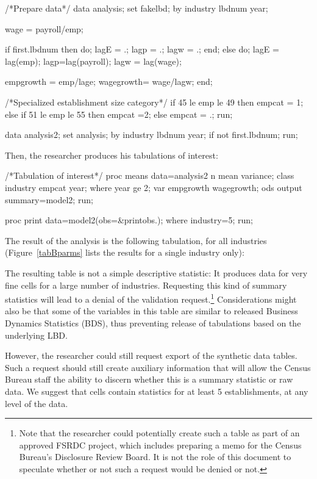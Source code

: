 \documentclass{article}
\begin{document}
\begin{Datastep}
/*Prepare data*/
data analysis;
set fakelbd;
by industry lbdnum year;

wage = payroll/emp;

if first.lbdnum then do;
 lagE = .;         lagp = .;         lagw = .;         
 end;
else                 do; 
 lagE = lag(emp);
 lagp=lag(payroll); 
 lagw = lag(wage); 

 empgrowth = emp/lage;
 wagegrowth= wage/lagw;
end;

/*Specialized establishment size category*/
if 45 le emp le 49 then empcat = 1;
else if 51 le emp le 55 then empcat =2;
else empcat = .;
run;

data analysis2;
	set analysis;
	by industry lbdnum year;
	if not first.lbdnum;
	run;
\end{Datastep}

Then, the researcher produces his tabulations of interest:

\begin{Sascode}[store=tabB]
/*Tabulation of interest*/
proc means data=analysis2 n mean variance;
class industry empcat year;
where  year ge 2;
var empgrowth wagegrowth;
ods output summary=model2;
run;

proc print data=model2(obs=&printobs.);
where industry=5;
run;
\end{Sascode}
The result of the analysis is the following tabulation, for all industries (Figure~\ref{tabBparms} lists the results for a single industry only):


The resulting table is not a simple descriptive statistic: It produces data for very fine cells for a large number of industries. Requesting this kind of summary statistics will lead to a denial of the validation request.\footnote{Note that the researcher could potentially create such a table as part of an approved FSRDC project, which includes preparing a memo for the Census Bureau's Disclosure Review Board. It is not the role of this document to speculate whether or not such a request would be denied or not. } Considerations might also be that some of the variables in this table are similar to released Business Dynamics Statistics (BDS), thus preventing release of tabulations based on the underlying LBD.

However, the researcher could still request export of the synthetic data tables. Such a request should still create auxiliary information that will allow the Census Bureau staff the ability to discern whether this is a summary statistic  or raw data. We suggest that cells contain statistics for at least 5 establishments, at any level of the data.
\end{document}
